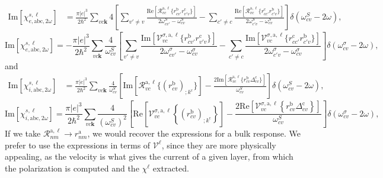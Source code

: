 \begin{align}\label{imchie2w}
\mathrm{Im}[\chi_{e,\mathrm{a}\mathrm{b}\mathrm{c},2\omega}^{s,\ell}]
&=
\frac{\pi |e|^3}{2\hbar^2} 
\sum_{vc\mathbf{k}} 
4
\left[
\sum_{v'\ne v}
\frac{\mathrm{Re}[\mathcal{R}^{\mathrm{a},\ell}_{vc}\{r^{\mathrm{b}}_{cv'}r^{\mathrm{c}}_{v'v}\}]}{2\omega^S_{cv'}-\omega^S_{cv}}
-
\sum_{c'\ne c}
\frac{\mathrm{Re}[\mathcal{R}^{\mathrm{a},\ell}_{vc}\{r^{\mathrm{c}}_{cc'}r^{\mathrm{b}}_{c'v}\}]}
{2\omega^S_{c'v}-\omega^S_{cv}}
\right]
\delta(\omega^S_{cv}-2\omega)
,
\end{align}  
\begin{equation}\label{c-calvimchie2wn}
\mathrm{Im}[\chi_{e,\mathrm{a}\mathrm{b}\mathrm{c},2\omega}^{s,\ell}] =
-\frac{\pi |e|^3}{2\hbar^2}\sum_{vc\mathbf{k}}\frac{4}{\omega^{S}_{cv}}
\left[
\sum_{v'\ne
  v}\frac{\mathrm{Im}[\mathcal{V}^{\sigma,\text{a},\ell}_{vc}\{r^{\mathrm{b}}_{cv'}r^{\mathrm{c}}_{v'v}\}]}
{2\omega^\sigma_{cv'}-\omega^\sigma_{cv}}
- \sum_{c'\ne
  c}\frac{\mathrm{Im}[\mathcal{V}^{\sigma,\text{a},\ell}_{vc}\{r^{\mathrm{c}}_{cc'}r^{\mathrm{b}}_{c'v}\}]}
{2\omega^\sigma_{c'v}-\omega^\sigma_{cv}}
\right]\delta(\omega^\sigma_{cv}-2\omega),
\end{equation}
 and
\begin{align}\label{imchi2wf}
\mathrm{Im}[\chi_{i,\mathrm{a}\mathrm{b}\mathrm{c},2\omega}^{s,\ell}]
&=
\frac{\pi|e|^3}{2\hbar^2}\sum_{vc\mathbf{k}}
\frac{4}{\omega^S_{cv}}
\left[
\mathrm{Im}[\mathcal{R}^{\mathrm{a},\ell}_{vc}\{\left(r^{\mathrm{b}}_{cv}\right)_{;k^{\mathrm{c}}}\}]
-
\frac{2\mathrm{Im}[\mathcal{R}^{\mathrm{a},\ell}_{vc}\{r^{\mathrm{b}}_{cv}\Delta^{\mathrm{c}}_{cv}\}]}{\omega^S_{cv}}
\right]\delta(\omega^S_{cv}-2\omega)
,
\end{align}
\begin{equation}\label{c-calvimchi2wn}
\mathrm{Im}[\chi_{i,\text{a}\text{b}\text{c},2\omega}^{s,\ell}] 
=
 \frac{\pi \vert
   e\vert^{3}}{2\hbar^2}\sum_{vc\mathbf{k}}\frac{4}{(\omega^{S}_{cv})^{2}}
\left[\mathrm{Re}\left[\mathcal{V}^{\sigma,\text{a},\ell}_{vc}\left\{\left(r^{\text{b}}_{cv}\right)_{;k^{\text{c}}}
\right\}\right] -
\frac{2\mathrm{Re}\left[\mathcal{V}^{\sigma,\text{a},\ell}_{vc}\left\{r^{\text{b}}_{cv}
\Delta^{\text{c}}_{cv}\right\}\right]}{\omega^{S}_{cv}}\right]\delta(\omega^\sigma_{cv}-2\omega)
,
\end{equation}
\noindent If we take $\mathcal{R}^{\mathrm{a},\ell}_{nm}\to r^\mathrm{a}_{nm}$, 
we
would recover the expressions for a bulk response.
We prefer to use the expressions in terms of $\mathcal{V}^\ell$, since they are
more physically appealing, as the velocity is what gives the current
of a given layer, from which the polarization is computed and the
$\chi^\ell$ extracted.   


